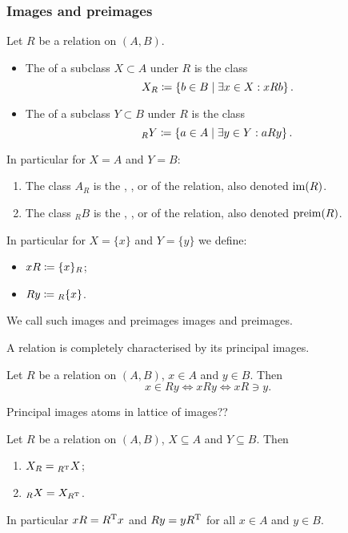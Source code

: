 \subsubsection{Images and preimages}
\begin{definition}
Let $R$ be a relation on $(A, B)$.
\begin{itemize}
\item The  of a subclass $X\subset A$ under $R$ is the class
\[ X_R \coloneqq \left\{ b\in B \;\middle|\; \exists x\in X: xRb \right\}. \]
\item The  of a subclass $Y\subset B$ under $R$ is the class
\[ _RY \coloneqq \left\{ a\in A \;\middle|\; \exists y\in Y: aRy \right\}. \]
\end{itemize}
In particular for $X=A$ and $Y=B$:
\begin{enumerate}
\item The class $A_R$ is the , ,  or  of the relation, also denoted $\operatorname{im}(R)$.
\item The class $_RB$ is the , ,  or  of the relation, also denoted $\operatorname{preim}(R)$.
\end{enumerate}
In particular for $X = \{x\}$ and $Y = \{y\}$ we define:
\begin{itemize}
\item $xR \coloneqq \{x\}_R$;
\item $Ry \coloneqq {_R\{x\}}$.
\end{itemize}
We call such images and preimages  images and preimages.
\end{definition}

A relation is completely characterised by its principal images.
\begin{lemma} \label{relationFromPrincipalImages}
Let $R$ be a relation on $(A, B)$, $x\in A$ and $y\in B$. Then
\[ x\in Ry \iff xRy \iff xR \ni y. \]
\end{lemma}
Principal images atoms in lattice of images??

\begin{lemma}
Let $R$ be a relation on $(A, B)$, $X\subseteq A$ and $Y\subseteq B$. Then
\begin{enumerate}
\item $X_R = {_{R^{\mathrm{T}}}X}$;
\item $_RX = X_{R^{\mathrm{T}}}$.
\end{enumerate}
In particular $xR = R^{\mathrm{T}} x$ and $Ry = yR^{\mathrm{T}}$ for all $x\in A$ and $y\in B$.
\end{lemma}

